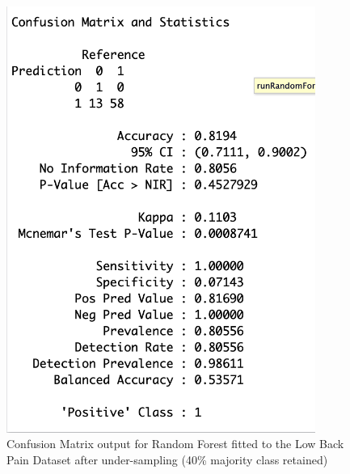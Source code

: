 \begin{figure}[!htbp]
    \centering
    \begin{minipage}{0.45\textwidth}
        \centering
        \includegraphics[width=0.9\textwidth]{ThesisTemplate/appendix/images/Chapter5Appendix/ConfusionMatrix40/LBP.png}
        \caption{Confusion Matrix output for Random Forest fitted to the Low Back Pain Dataset after under-sampling (40\% majority class retained)}
        \label{fig:matrixLBP40}
    \end{minipage}\hfill
    \begin{minipage}{0.45\textwidth}
        \centering

\end{minipage}
\end{figure}

